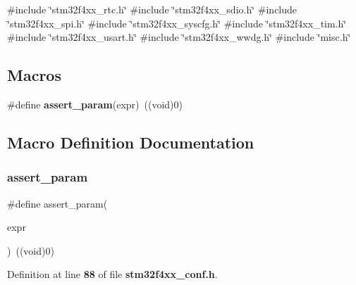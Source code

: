 {\ttfamily \#include \char`\"{}stm32f4xx\+\_\+rtc.\+h\char`\"{}}\newline
{\ttfamily \#include \char`\"{}stm32f4xx\+\_\+sdio.\+h\char`\"{}}\newline
{\ttfamily \#include \char`\"{}stm32f4xx\+\_\+spi.\+h\char`\"{}}\newline
{\ttfamily \#include \char`\"{}stm32f4xx\+\_\+syscfg.\+h\char`\"{}}\newline
{\ttfamily \#include \char`\"{}stm32f4xx\+\_\+tim.\+h\char`\"{}}\newline
{\ttfamily \#include \char`\"{}stm32f4xx\+\_\+usart.\+h\char`\"{}}\newline
{\ttfamily \#include \char`\"{}stm32f4xx\+\_\+wwdg.\+h\char`\"{}}\newline
{\ttfamily \#include \char`\"{}misc.\+h\char`\"{}}\newline
\subsection*{Macros}
\begin{DoxyCompactItemize}
\item 
\#define \textbf{ assert\+\_\+param}(expr)~((void)0)
\end{DoxyCompactItemize}


\subsection{Macro Definition Documentation}
\mbox{\label{stm32f4xx__conf_8h_a631dea7b230e600555f979c62af1de21}} 
\subsubsection{assert\+\_\+param}
{\footnotesize\ttfamily \#define assert\+\_\+param(\begin{DoxyParamCaption}\item[{}]{expr }\end{DoxyParamCaption})~((void)0)}



Definition at line \textbf{ 88} of file \textbf{ stm32f4xx\+\_\+conf.\+h}.


